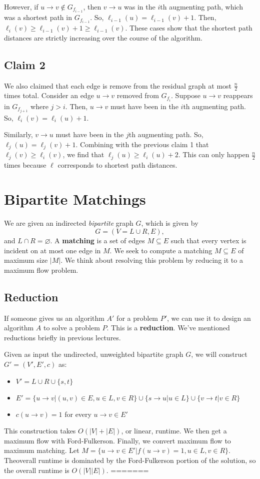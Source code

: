 \documentclass[titlepage, 12pt, leqno]{article}
\begin{document}
However, if $u\rightarrow v \notin G_{f_{i-1}}$, then $v\rightarrow u$ was in 
the $i$th augmenting path, which was a shortest path in $G_{f_{i-1}}$. So,
$\ell_{i-1}(u)= \ell_{i-1}(v) + 1$. Then, $\ell_{i}(v) \ge \ell_{i-1}(v) + 1
\ge \ell_{i-1}(v)$. These cases show that the shortest path distances are
strictly increasing over the course of the algorithm.

\subsection{Claim 2}
We also claimed that each edge is remove from the residual graph at most
$\frac{n}{2}$ times total. Consider an edge $u \rightarrow v$ removed from
$G_{f_{i}}$. Suppose $u \rightarrow v$ reappears in $G_{f_{j+1}}$ where $j>i$.
Then, $u\rightarrow v$ must have been in the $i$th augmenting path. So,
$\ell_{i}(v) = \ell_{i}(u) + 1$. 

Similarly, $v\rightarrow u$ must have been in the $j$th augmenting path. So,
$\ell_{j}(u) = \ell_{j}(v) + 1$. Combining with the previous claim 1 that 
$\ell_{j}(v) \ge \ell_{i}(v)$, we find that $\ell_{j}(u) \ge \ell_{i}(u)+2$.
This can only happen $\frac{n}{2}$ times because $\ell$ corresponds to shortest
path distances.

\pagebreak
\section{Bipartite Matchings}
We are given an indirected \textit{bipartite} graph $G$, which is given by
\[
G = (V = L \cup R, E),
\]
and $L \cap R = \varnothing$. A \textbf{matching} is a set of edges 
$M \subseteq E$ such that every vertex is incident on at most one edge in $M$.
We seek to compute a matching $M \subseteq E$ of maximum size $|M|$. We think
about resolving this problem by reducing it to a maximum flow problem.

\subsection{Reduction}
If someone gives us an algorithm $A'$ for a problem $P'$, we can use it to 
design an algorithm $A$ to solve a problem $P$. This is a \textbf{reduction}.
We've mentioned reductions briefly in previous lectures.

Given as input the undirected, unweighted bipartite graph $G$, we will construct
$G' = (V', E', c)$ as:
\begin{itemize}
    \item $V' = L \cup R \cup \{s,t\}$
    \item $E' = \{u \rightarrow v | (u,v) \in E, u \in  L, v \in R\}
        \cup \{s\rightarrow u |u \in L\}
        \cup \{v \rightarrow t | v \in R\}$
    \item $c(u \rightarrow v) = 1$ for every $u \rightarrow v \in E'$
\end{itemize}
This construction takes $O(|V| + |E|)$, or linear, runtime. We then get a 
maximum flow with Ford-Fulkerson. Finally, we convert maximum flow to maximum
matching. Let $M = \{u \rightarrow v \in E' | f(u\rightarrow v) = 1, u \in L,
v \in R\}$. Theoverall runtime is dominated by the Ford-Fulkerson portion of 
the solution, so the overall runtime is $O(|V||E|)$.
=======
\end{document}
